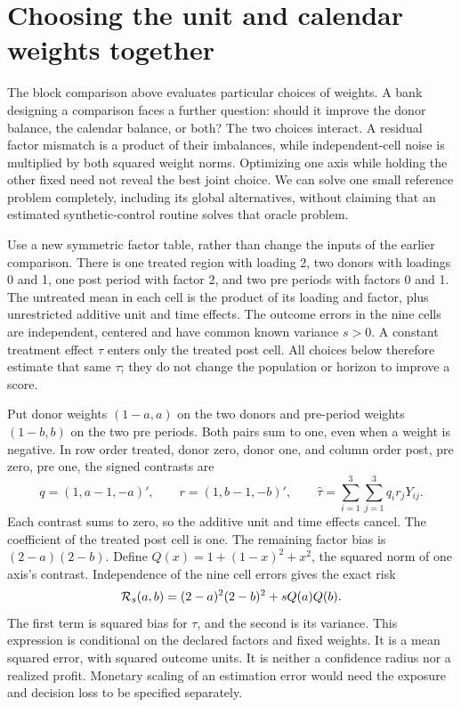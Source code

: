 \section{Choosing the unit and calendar weights together}
\label{exec17:s6-joint}

The block comparison above evaluates particular choices of weights. A bank
designing a comparison faces a further question: should it improve the donor
balance, the calendar balance, or both? The two choices interact. A residual
factor mismatch is a product of their imbalances, while independent-cell
noise is multiplied by both squared weight norms. Optimizing one axis while
holding the other fixed need not reveal the best joint choice. We can solve
one small reference problem completely, including its global alternatives,
without claiming that an estimated synthetic-control routine solves that
oracle problem.\citep{exec17_s6_extension}

Use a new symmetric factor table, rather than change the inputs of the earlier
comparison. There is one treated region with loading 2, two donors with
loadings 0 and 1, one post period with factor 2, and two pre periods with
factors 0 and 1. The untreated mean in each cell is the product of its loading
and factor, plus unrestricted additive unit and time effects. The outcome
errors in the nine cells are independent, centered and have common known
variance $s>0$. A constant treatment effect $\tau$ enters only the treated
post cell. All choices below therefore estimate that same $\tau$; they do
not change the population or horizon to improve a score.

Put donor weights $(1-a,a)$ on the two donors and pre-period weights
$(1-b,b)$ on the two pre periods. Both pairs sum to one, even when a weight
is negative. In row order treated, donor zero, donor one, and column order
post, pre zero, pre one, the signed contrasts are
\begin{equation}
 q=(1,a-1,-a)',\qquad r=(1,b-1,-b)',\qquad
 \widehat\tau=\sum_{i=1}^3\sum_{j=1}^3q_i r_jY_{ij}.
 \label{exec17:s6-joint-contrast}
\end{equation}
Each contrast sums to zero, so the additive unit and time effects cancel.
The coefficient of the treated post cell is one. The remaining factor bias
is $(2-a)(2-b)$. Define $Q(x)=1+(1-x)^2+x^2$, the squared norm of one
axis's contrast. Independence of the nine cell errors gives the exact risk
\begin{equation}
 {\cal R}_s(a,b)
  =(2-a)^2(2-b)^2+sQ(a)Q(b).
 \label{exec17:s6-joint-risk}
\end{equation}
The first term is squared bias for $\tau$, and the second is its variance.
This expression is conditional on the declared factors and fixed weights.
It is a mean squared error, with squared outcome units. It is neither a
confidence radius nor a realized profit. Monetary scaling of an estimation
error would need the exposure and decision loss to be specified separately.

